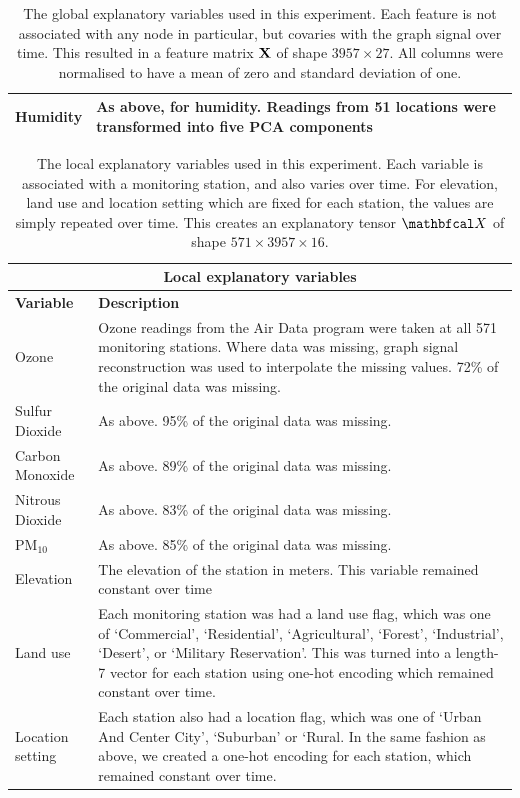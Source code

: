 \begin{table}[ht]
\begin{tabular}{|l|p{11cm}|}
    Humidity & As above, for humidity. Readings from 51 locations were transformed into five PCA components  \\
    \hline
    \end{tabular}
    \caption[Global explanatory variables used in the environmental modelling application]{The global explanatory variables used in this experiment. Each feature is not associated with any node in particular, but covaries with the graph signal over time. This resulted in a feature matrix $\mathbf{X}$ of shape $3957 \times 27$. All columns were normalised to have a mean of zero and standard deviation of one. }
    \label{tab:features1}
\end{table}

\begin{table}[ht]
    \renewcommand{\arraystretch}{1.8}
    \centering
    \begin{tabular}{|l|p{10.5cm}|}
    \hline
    \multicolumn{2}{|c|}{\textbf{Local explanatory variables}} \\
    \hline
    \textbf{Variable} & \textbf{Description} \\
    \hline
    Ozone & Ozone readings from the Air Data program were taken at all 571 monitoring stations. Where data was missing, graph signal reconstruction was used to interpolate the missing values. 72\% of the original data was missing. \\
    Sulfur Dioxide & As above. 95\% of the original data was missing.  \\
    Carbon Monoxide & As above. 89\% of the original data was missing.  \\
    Nitrous Dioxide & As above. 83\% of the original data was missing.  \\
    PM$_{10}$  & As above. 85\% of the original data was missing.  \\
    Elevation & The elevation of the station in meters. This variable remained constant over time \\
    Land use & Each monitoring station was had a land use flag, which was one of `Commercial', `Residential', `Agricultural', `Forest', `Industrial', `Desert', or `Military Reservation'. This was turned into a length-7 vector for each station using one-hot encoding which remained constant over time. \\
    Location setting & Each station also had a location flag, which was one of `Urban And Center City', `Suburban' or `Rural. In the same fashion as above, we created a one-hot encoding for each station, which remained constant over time. \\
    \hline
    \end{tabular}
    \caption[Local explanatory variables used in environmental modelling application]{The local explanatory variables used in this experiment. Each variable is associated with a monitoring station, and also varies over time. For elevation, land use and location setting which are fixed for each station, the values are simply repeated over time. This creates an explanatory tensor $\Xt$ of shape $571 \times 3957 \times 16$. }
    \label{tab:features2}
\end{table}
    
